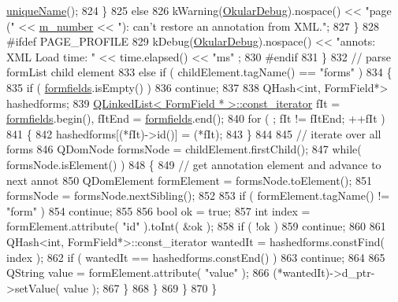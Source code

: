 \begin{DoxyCode}
      \hyperlink{classOkular_1_1Annotation_a8a86ff8c722014c2296112d0fa703eab}{uniqueName}();
824                 \}
825                 \textcolor{keywordflow}{else}
826                     kWarning(\hyperlink{debug__p_8h_af16c6e32a95969dd0605d792ec9807c7}{OkularDebug}).nospace() << \textcolor{stringliteral}{"page ("} << 
      \hyperlink{classOkular_1_1PagePrivate_a449baffebfd4db332b181cb2e644ab5e}{m\_number} << \textcolor{stringliteral}{"): can't restore an annotation from XML."};
827             \}
828 \textcolor{preprocessor}{#ifdef PAGE\_PROFILE}
829             kDebug(\hyperlink{debug__p_8h_af16c6e32a95969dd0605d792ec9807c7}{OkularDebug}).nospace() << \textcolor{stringliteral}{"annots: XML Load time: "} << time.elapsed() << \textcolor{stringliteral}{"ms"}
      ;
830 \textcolor{preprocessor}{#endif}
831         \}
832         \textcolor{comment}{// parse formList child element}
833         \textcolor{keywordflow}{else} \textcolor{keywordflow}{if} ( childElement.tagName() == \textcolor{stringliteral}{"forms"} )
834         \{
835             \textcolor{keywordflow}{if} ( \hyperlink{classOkular_1_1PagePrivate_a398106cf0b0b54b59dd2bbc625092151}{formfields}.isEmpty() )
836                 \textcolor{keywordflow}{continue};
837 
838             QHash<int, FormField*> hashedforms;
839             \hyperlink{classQLinkedList}{QLinkedList< FormField * >::const\_iterator} fIt = 
      \hyperlink{classOkular_1_1PagePrivate_a398106cf0b0b54b59dd2bbc625092151}{formfields}.begin(), fItEnd = \hyperlink{classOkular_1_1PagePrivate_a398106cf0b0b54b59dd2bbc625092151}{formfields}.end();
840             \textcolor{keywordflow}{for} ( ; fIt != fItEnd; ++fIt )
841             \{
842                 hashedforms[(*fIt)->id()] = (*fIt);
843             \}
844 
845             \textcolor{comment}{// iterate over all forms}
846             QDomNode formsNode = childElement.firstChild();
847             \textcolor{keywordflow}{while}( formsNode.isElement() )
848             \{
849                 \textcolor{comment}{// get annotation element and advance to next annot}
850                 QDomElement formElement = formsNode.toElement();
851                 formsNode = formsNode.nextSibling();
852 
853                 \textcolor{keywordflow}{if} ( formElement.tagName() != \textcolor{stringliteral}{"form"} )
854                     \textcolor{keywordflow}{continue};
855 
856                 \textcolor{keywordtype}{bool} ok = \textcolor{keyword}{true};
857                 \textcolor{keywordtype}{int} index = formElement.attribute( \textcolor{stringliteral}{"id"} ).toInt( &ok );
858                 \textcolor{keywordflow}{if} ( !ok )
859                     \textcolor{keywordflow}{continue};
860 
861                 QHash<int, FormField*>::const\_iterator wantedIt = hashedforms.constFind( index );
862                 \textcolor{keywordflow}{if} ( wantedIt == hashedforms.constEnd() )
863                     \textcolor{keywordflow}{continue};
864 
865                 QString value = formElement.attribute( \textcolor{stringliteral}{"value"} );
866                 (*wantedIt)->d\_ptr->setValue( value );
867             \}
868         \}
869     \}
870 \}
\end{DoxyCode}
